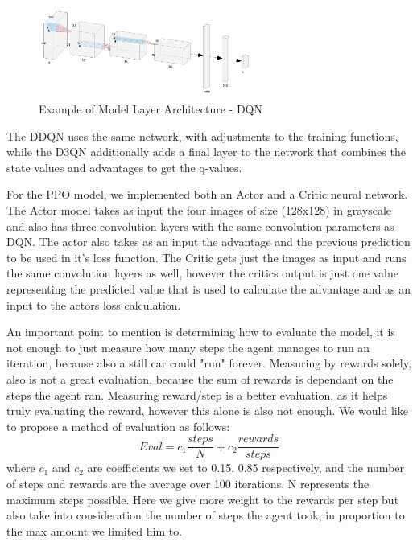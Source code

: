 \documentclass[leqno]{article}
\begin{document}
\begin{multicols}{2}
\begin{figure}[H]
\centering
    \centering\includegraphics[width=7cm]{figs/img1.jpeg}
    \caption{Example of Model Layer Architecture - DQN}
  \label{architecture}
\end{figure}

The DDQN uses the same network, with adjustments to the training functions, while the D3QN additionally adds a final layer to the network that combines the state values and advantages to get the q-values.

For the PPO model, we implemented both an Actor and a Critic neural network. The Actor model takes as input the four images of size (128x128) in grayscale and also has three convolution layers with the same convolution parameters as DQN. The actor also takes as an input the advantage and the previous prediction to be used in it's loss function. The Critic gets just the images as input and runs the same convolution layers as well, however the critics output is just one value representing the predicted value that is used to calculate the advantage and as an input to the actors loss calculation.

An important point to mention is determining how to evaluate the model, it is not enough to just measure how many steps the agent manages to run an iteration, because also a still car could "run" forever. Measuring by rewards solely, also is not a great evaluation, because the sum of rewards is dependant on the steps the agent ran. Measuring reward/step is a better evaluation, as it helps truly evaluating the reward, however this alone is also not enough. We would like to propose a method of evaluation as follows:
\begin{equation*}
Eval = c_{1}\frac{steps}{N} + c_{2}\frac{rewards}{steps} \tag{4.1}\label{eq:4.1}
\end{equation*}
where $c_{1}$ and $c_{2}$ are coefficients we set to 0.15, 0.85 respectively, and the number of steps and rewards are the average over 100 iterations. N represents the maximum steps possible. Here we give more weight to the rewards per step but also take into consideration the number of steps the agent took, in proportion to the max amount we limited him to.


\end{multicols}
\end{document}
